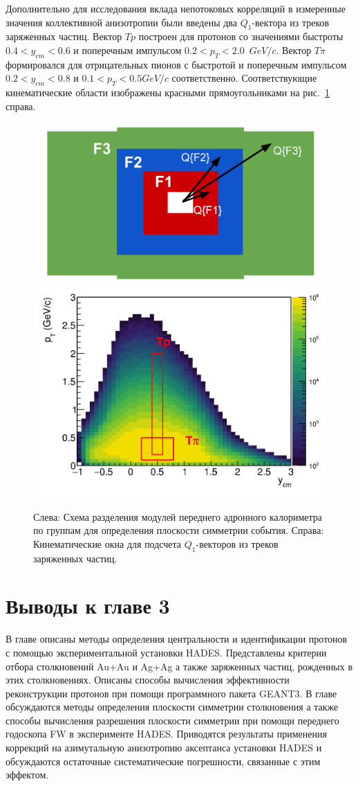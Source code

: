 Дополнительно для исследования вклада непотоковых корреляций в измеренные значения коллективной анизотропии были введены два $Q_1$-вектора из треков заряженных частиц. 
Вектор $Tp$ построен для протонов со значениями быстроты $0.4<y_{cm}<0.6$ и поперечным импульсом $0.2<p_{T}<2.0$~$GeV/c$.
Вектор $T\pi$ формировался для отрицательных пионов с быстротой и поперечным импульсом $0.2<y_{cm}<0.8$ и $0.1<p_T<0.5 GeV/c$ соответственно.
Соответствующие кинематические области изображены красными прямоугольниками на рис.~\ref{fig:bmn_subevents} справа.
%
\begin{figure}[ht]
\begin{center}
\includegraphics[width=0.45\linewidth]{images/FHCal_layout.png}
\includegraphics[width=0.45\linewidth]{images/pT_ycm_protons.png}
\caption{
Слева: Схема разделения модулей переднего адронного калориметра по группам для определения плоскости симметрии события.
Справа: Кинематические окна для подсчета $Q_1$-векторов из треков заряженных частиц.
}
\label{fig:bmn_subevents}
\end{center}
\end{figure}

\section{Выводы к главе 3}

В главе описаны методы определения центральности и идентификации протонов с помощью экспериментальной установки HADES.
Представлены критерии отбора столкновений Au+Au и Ag+Ag а также заряженных частиц, рожденных в этих столкновениях.
Описаны способы вычисления эффективности реконструкции протонов при помощи программного пакета GEANT3.
В главе обсуждаются методы определения плоскости симметрии столкновения а также способы вычисления разрешения плоскости симметрии при помощи переднего годоскопа FW в эксперименте HADES.
Приводятся результаты применения коррекций на азимутальную анизотропию аксептанса установки HADES и обсуждаются остаточные систематические погрешности, связанные с этим эффектом.

